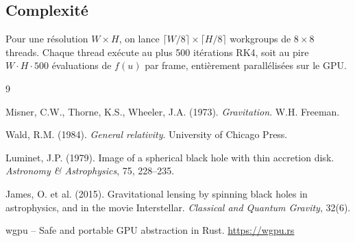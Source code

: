 \documentclass[12pt, a4paper]{article}
\begin{document}
\subsection{Complexité}

Pour une résolution $W \times H$, on lance
$\lceil W/8 \rceil \times \lceil H/8 \rceil$ workgroups de $8 \times 8$ threads.
Chaque thread exécute au plus 500 itérations RK4, soit au pire
$W \cdot H \cdot 500$ évaluations de $f(u)$ par frame, entièrement parallélisées sur le GPU.

\newpage

\begin{thebibliography}{9}

Misner, C.W., Thorne, K.S., Wheeler, J.A. (1973).
\textit{Gravitation}. W.H. Freeman.

Wald, R.M. (1984).
\textit{General relativity}. University of Chicago Press.

Luminet, J.P. (1979).
Image of a spherical black hole with thin accretion disk.
\textit{Astronomy \& Astrophysics}, 75, 228--235.

James, O. et al. (2015).
Gravitational lensing by spinning black holes in astrophysics,
and in the movie Interstellar.
\textit{Classical and Quantum Gravity}, 32(6).

wgpu \--- Safe and portable GPU abstraction in Rust.
\url{https://wgpu.rs}

\end{thebibliography}
\end{document}
